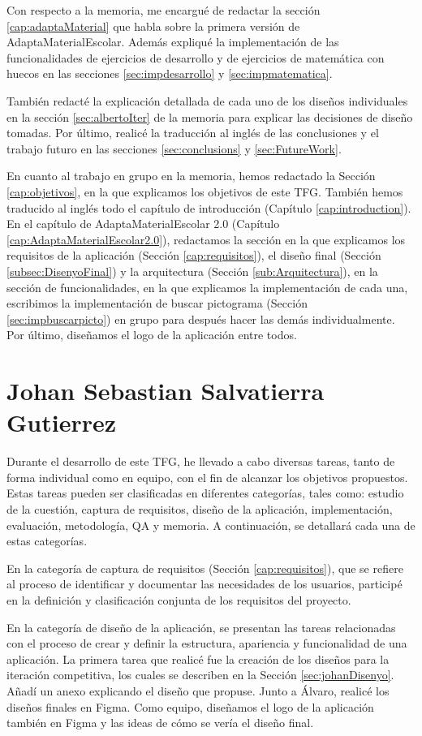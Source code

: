 Con respecto a la memoria, me encargué de redactar la sección \ref{cap:adaptaMaterial} que habla sobre la primera versión de AdaptaMaterialEscolar. Además expliqué la implementación de las funcionalidades de ejercicios de desarrollo y de ejercicios de matemática con huecos en las secciones \ref{sec:impdesarrollo} y \ref{sec:impmatematica}.

También redacté la explicación detallada de cada uno de los diseños individuales en la sección \ref{sec:albertoIter} de la memoria para explicar las decisiones de diseño tomadas. Por último, realicé la traducción al inglés de las conclusiones y el trabajo futuro en las secciones \ref{sec:conclusions} y \ref{sec:FutureWork}.

En cuanto al trabajo en grupo en la memoria, hemos redactado la Sección \ref{cap:objetivos}, en la que explicamos los objetivos de este TFG. También hemos traducido al inglés todo el capítulo de introducción (Capítulo \ref{cap:introduction}). En el capítulo de AdaptaMaterialEscolar 2.0 (Capítulo \ref{cap:AdaptaMaterialEscolar2.0}), redactamos la sección en la que explicamos los requisitos de la aplicación (Sección \ref{cap:requisitos}), el diseño final (Sección \ref{subsec:DisenyoFinal}) y la arquitectura (Sección \ref{sub:Arquitectura}), en la sección de funcionalidades, en la que explicamos la implementación de cada una, escribimos la implementación de buscar pictograma (Sección \ref{sec:impbuscarpicto}) en grupo para después hacer las demás individualmente. Por último, diseñamos el logo de la aplicación entre todos.


\section{Johan Sebastian Salvatierra Gutierrez}
Durante el desarrollo de este TFG, he llevado a cabo diversas tareas, tanto de forma individual como en equipo, con el fin de alcanzar los objetivos propuestos. Estas tareas pueden ser clasificadas en diferentes categorías, tales como: estudio de la cuestión, captura de requisitos, diseño de la aplicación, implementación, evaluación, metodología, QA y memoria. A continuación, se detallará cada una de estas categorías.

En la categoría de captura de requisitos (Sección \ref{cap:requisitos}), que se refiere al proceso de identificar y documentar las necesidades de los usuarios, participé en la definición y clasificación conjunta de los requisitos del proyecto.

En la categoría de diseño de la aplicación, se presentan las tareas relacionadas con el proceso de crear y definir la estructura, apariencia y funcionalidad de una aplicación. La primera tarea que realicé fue la creación de los diseños para la iteración competitiva, los cuales se describen en la Sección \ref{sec:johanDisenyo}. Añadí un anexo explicando el diseño que propuse. Junto a Álvaro, realicé los diseños finales en Figma. Como equipo, diseñamos el logo de la aplicación también en Figma y las ideas de cómo se vería el diseño final.


